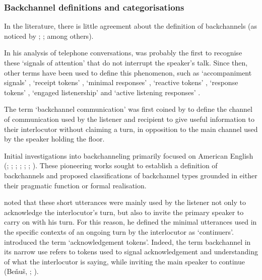 \subsubsection{Backchannel definitions and categorisations}
\hypertarget{Toc191305944}{}
In the literature, there is little agreement about the definition of backchannels (as noticed by \citealt{Lennon1990,Lennon2000}; \citealt{Rühlemann2007}; \citealt{Wolf2008} among others).

In his analysis of telephone conversations, \citet{Fries1952} was probably the first to recognise these ‘signals of attention’ that do not interrupt the speaker’s talk. Since then, other terms have been used to define this phenomenon, such as ‘accompaniment signals’ \citep{Kendon1967}, ‘receipt tokens’ \citep{Heritage1984}, ‘minimal responses’ \citep{Fellegy1995}, ‘reactive tokens’ \citep{ClancyEtAl1996}, ‘response tokens’ \citep{Gardner2001}, ‘engaged listenership’ \citep{Lambertz2011} and ‘active listening responses’ \citep{Simon2018}.

The term ‘backchannel communication’ was first coined by \citet{Yngve1970} to define the channel of communication used by the listener and recipient to give useful information to their interlocutor without claiming a turn, in opposition to the main channel used by the speaker holding the floor.

Initial investigations into backchanneling primarily focused on American English (\citealt{Duncan1974}; \citealt{DuncanFiske1977}; \citealt{Fries1952}; \citealt{Goodwin1986}; \citealt{Jefferson1983}; \citealt{Schegloff1982}; \citealt{Yngve1970}). These pioneering works sought to establish a definition of backchannels and proposed classifications of backchannel types grounded in either their pragmatic function or formal realisation.

\citet{Schegloff1982} noted that these short utterances were mainly used by the listener not only to acknowledge the interlocutor’s turn, but also to invite the primary speaker to carry on with his turn. For this reason, he defined the minimal utterances used in the specific contexts of an ongoing turn by the interlocutor as ‘continuers’. \citet{Jefferson1983} introduced the term ‘acknowledgement tokens’. Indeed, the term backchannel in its narrow use refers to tokens used to signal acknowledgement and understanding of what the interlocutor is saying, while inviting the main speaker to continue (Beňuš, \citealt{GravanoHirschberg2007}; \citealt{Hasegawa2014}).

